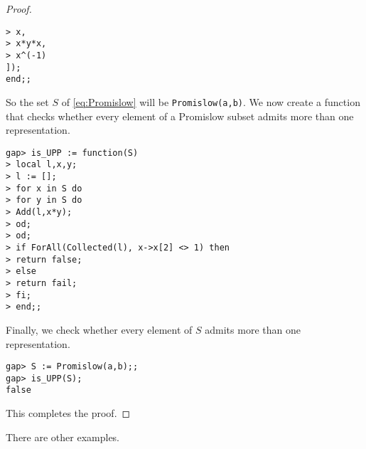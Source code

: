 \begin{proof}
\begin{lstlisting}
> x,
> x*y*x,
> x^(-1)
]);
end;;
\end{lstlisting}
So the set $S$ of \eqref{eq:Promislow} 
will be \lstinline{Promislow(a,b)}. We now
create a function that checks whether
every element of a Promislow subset 
admits more than one representation.
\begin{lstlisting}
gap> is_UPP := function(S)
> local l,x,y;
> l := [];
> for x in S do
> for y in S do
> Add(l,x*y);
> od;
> od;
> if ForAll(Collected(l), x->x[2] <> 1) then
> return false;
> else
> return fail;
> fi;
> end;;
\end{lstlisting}
Finally, we check whether every element of 
$S$ admits more than one representation.
\begin{lstlisting}
gap> S := Promislow(a,b);;
gap> is_UPP(S);
false
\end{lstlisting}
This completes the proof. 
\end{proof}

There are other examples. 



